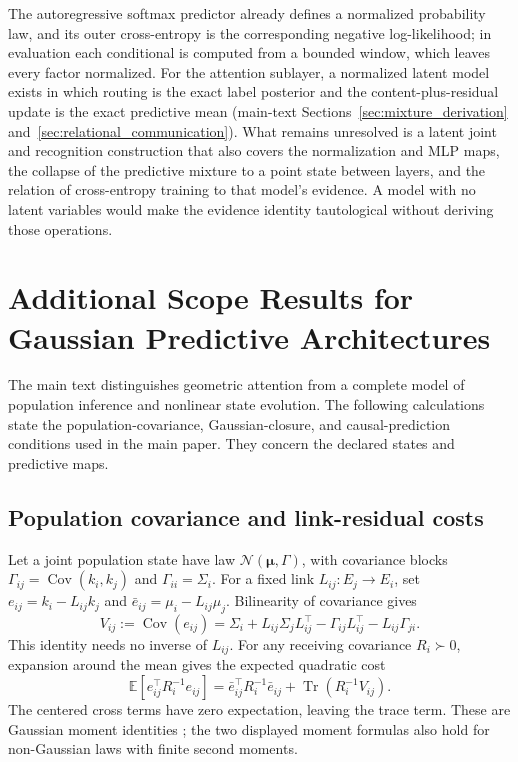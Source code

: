 \documentclass[twoside,11pt]{article}
\begin{document}
The autoregressive softmax predictor already defines a normalized probability law, and its outer cross-entropy is the corresponding negative log-likelihood; in evaluation each conditional is computed from a bounded window, which leaves every factor normalized. For the attention sublayer, a normalized latent model exists in which routing is the exact label posterior and the content-plus-residual update is the exact predictive mean (main-text Sections~\ref{sec:mixture_derivation} and~\ref{sec:relational_communication}). What remains unresolved is a latent joint and recognition construction that also covers the normalization and MLP maps, the collapse of the predictive mixture to a point state between layers, and the relation of cross-entropy training to that model's evidence. A model with no latent variables would make the evidence identity tautological without deriving those operations.


\section{Additional Scope Results for Gaussian Predictive Architectures}
\label{app:architecture_scope}

The main text distinguishes geometric attention from a complete model of population inference and nonlinear state evolution. The following calculations state the population-covariance, Gaussian-closure, and causal-prediction conditions used in the main paper. They concern the declared states and predictive maps.

\subsection{Population covariance and link-residual costs}
\label{sec:population_link_residuals}

Let a joint population state have law
\(\mathcal N(\boldsymbol\mu,\Gamma)\), with covariance blocks
\(\Gamma_{ij}=\operatorname{Cov}(k_i,k_j)\) and
\(\Gamma_{ii}=\Sigma_i\). For a fixed link \(L_{ij}:E_j\to E_i\), set
\(e_{ij}=k_i-L_{ij}k_j\) and
\(\bar e_{ij}=\mu_i-L_{ij}\mu_j\). Bilinearity of covariance gives
\begin{equation}
V_{ij}:=\operatorname{Cov}(e_{ij})
=\Sigma_i+L_{ij}\Sigma_jL_{ij}^{\top}
-\Gamma_{ij}L_{ij}^{\top}-L_{ij}\Gamma_{ji}.
\label{eq:population_residual_covariance}
\end{equation}
This identity needs no inverse of \(L_{ij}\). For any receiving covariance \(R_i\succ0\), expansion around the mean gives the expected quadratic cost
\begin{equation}
\mathbb E[e_{ij}^{\top}R_i^{-1}e_{ij}]
=\bar e_{ij}^{\top}R_i^{-1}\bar e_{ij}
+\operatorname{Tr}(R_i^{-1}V_{ij}).
\label{eq:population_residual_cost}
\end{equation}
The centered cross terms have zero expectation, leaving the trace term. These are Gaussian moment identities \citep{Bishop2006}; the two displayed moment formulas also hold for non-Gaussian laws with finite second moments.
\end{document}
